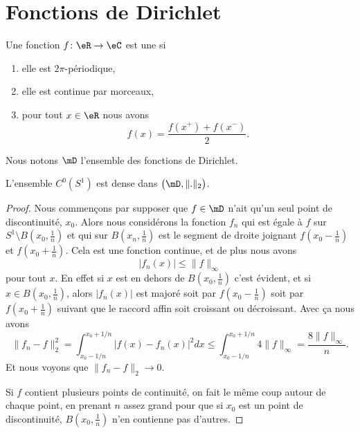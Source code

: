 \section{Fonctions de Dirichlet}

\begin{definition}
    Une fonction \( f\colon \eR\to \eC\) est une  si
    \begin{enumerate}
        \item
            elle est \( 2\pi\)-périodique,
        \item
            elle est continue par morceaux,
        \item
            pour tout \( x\in \eR\) nous avons
            \begin{equation}
                f(x)=\frac{ f(x^+)+f(x^-) }{2}.
            \end{equation}
    \end{enumerate}
    Nous notons \( \mD\) l'ensemble des fonctions de Dirichlet.
\end{definition}

\begin{lemma}   \label{LemVIwMsTC}
    L'ensemble \( C^0(S^1)\) est dense dans \( \big( \mD,\| . \|_2 \big)\).
\end{lemma}

\begin{proof}
    Nous commençons par supposer que \( f\in\mD\) n'ait qu'un seul point de discontinuité, \( x_0\). Alors nous considérons la fonction \( f_n\) qui est égale à \( f\) sur \( S^1\setminus B(x_0,\frac{1}{ n })\) et qui sur \( B(x_n,\frac{1}{ n })\) est le segment de droite joignant \( f(x_0-\frac{1}{ n })\) et \( f(x_0+\frac{1}{ n })\). Cela est une fonction continue, et de plus nous avons
    \begin{equation}
        | f_n(x) |\leq \| f \|_{\infty}
    \end{equation}
    pour tout \( x\). En effet si \( x\) est en dehors de \( B(x_0,\frac{1}{ n })\) c'est évident, et si \( x\in B(x_0,\frac{1}{ n })\), alors \( | f_n(x) |\) est majoré soit par \( f(x_0-\frac{1}{ n })\) soit par \( f(x_0+\frac{1}{ n })\) suivant que le raccord affin soit croissant ou décroissant. Avec ça nous avons
    \begin{equation}
        \| f_n-f \|_2^2=\int_{x_0-1/n}^{x_0+1/n}| f(x)-f_n(x) |^2dx\leq \int_{x_0-1/n}^{x_0+1/n}4\| f \|_{\infty}=\frac{ 8\| f \|_{\infty} }{ n }.
    \end{equation}
    Et nous voyons que \( \| f_n-f \|_2\to 0\).

    Si \( f\) contient plusieurs points de continuité, on fait le même coup autour de chaque point, en prenant \( n\) assez grand pour que si \( x_0\) est un point de discontinuité, \( B(x_0,\frac{1}{ n })\) n'en contienne pas d'autres.
\end{proof}

